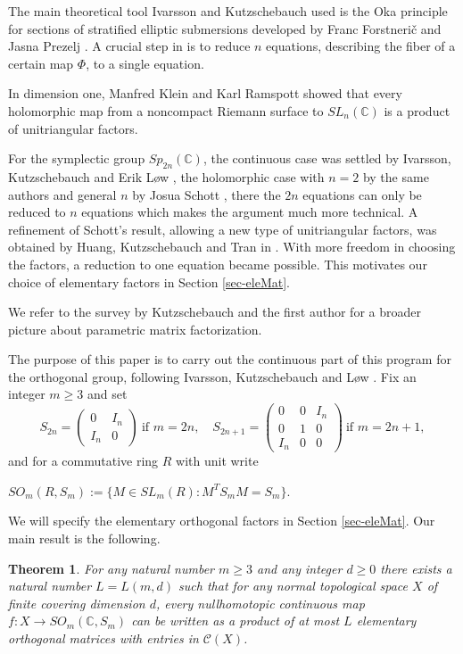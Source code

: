 \documentclass[11pt]{amsart}
\newtheorem{theorem}{Theorem}[section]
\theoremstyle{definition}
\theoremstyle{remark}
\theoremstyle{remark}
\newcommand{\C}{\mathbb{C}}
\begin{document}
The main theoretical tool Ivarsson and Kutzschebauch used is the Oka principle for sections of stratified elliptic submersions  developed by Franc Forstneri{\v c} and Jasna Prezelj \cite[\S 7]{MR1812449}. A crucial step in \cite{06014072} is to reduce $n$ equations, describing the fiber of a certain map $\Phi$, to a single equation.  

In dimension one, Manfred Klein and Karl Ramspott \cite[\S IV]{MR0966022} showed that every holomorphic map from a noncompact Riemann surface to $SL_n(\C)$ is a product of unitriangular factors. 

\smallskip
For the symplectic group $Sp_{2n}(\C)$, the continuous case was settled by Ivarsson, Kutzschebauch and Erik L{\o}w \cite{MR4078081}, the holomorphic case with $n=2$ by the same authors \cite{MR4578529} and general $n$ by Josua Schott \cite{900569216}, there the $2n$ equations can only be reduced to $n$ equations which makes the argument much more technical. 
A refinement of Schott's result, allowing a new type of unitriangular factors, was obtained by Huang, Kutzschebauch and Tran in \cite{MR5101717}. With more freedom in choosing the factors, a reduction to one equation became possible. This motivates our choice of elementary factors in Section \ref{sec-eleMat}. 



We refer to the survey  \cite{MR5024280} by Kutzschebauch and the first author for a broader picture about parametric matrix factorization.

\medskip
The purpose of this paper is to carry out the continuous part of this program for the orthogonal group, following Ivarsson, Kutzschebauch and L{\o}w \cite{MR4078081}. Fix an integer $m\ge 3$ and set
\begin{equation*}
S_{2n} = \begin{pmatrix}0&I_n\\ I_n&0\end{pmatrix}\ \text{if } m=2n,
\quad 
S_{2n+1}=\begin{pmatrix}0&0&I_n\\ 0&1&0\\ I_n&0&0\end{pmatrix}\ \text{if } m=2n+1,
\end{equation*}
and for a commutative ring $R$ with unit write
\begin{center}
$    SO_m(R,S_m):=\{ M \in SL_m(R): M^{T}S_m M=S_m \}.$
\end{center}
We will specify the elementary orthogonal factors in Section \ref{sec-eleMat}. 
Our main result is the following. 
\begin{theorem} \label{cont-factorization}
    For any natural number $m \ge 3$ and any integer $d \ge 0$ there exists a natural
    number $L = L(m, d)$ such that for any normal topological space $X$ of finite covering dimension $d$, every nullhomotopic continuous map $f : X \to SO_{m}(\mathbb{C},S_m)$ can be written as a product of at most $L$ elementary orthogonal matrices with entries in $\mathcal{C}(X)$. 
\end{theorem}
\end{document}
